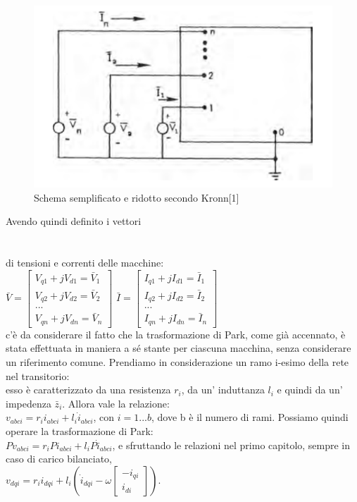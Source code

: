 \documentclass[Lau,noexaminfo]{sapthesis}
\begin{document}
	\begin{figure}
		\centering
		\includegraphics[height=0.25\textheight]{ridotta}
		\caption{Schema semplificato e ridotto secondo Kronn[1]}
	\end{figure}
	Avendo quindi definito i vettori\\\\\\ di tensioni e correnti delle macchine:\\
	$\bar{V}=\begin{bmatrix}
	V_{q1}+jV_{d1}=\bar{V}_1\\
	V_{q2}+jV_{d2}=\bar{V}_2\\
	...\\
	V_{qn}+jV_{dn}=\bar{V}_n
	\end{bmatrix}$\qquad
	$\bar{I}=\begin{bmatrix}
	I_{q1}+jI_{d1}=\bar{I}_1\\
	I_{q2}+jI_{d2}=\bar{I}_2\\
	...\\
	I_{qn}+jI_{dn}=\bar{I}_n
	\end{bmatrix}$\\
	c'è da considerare il fatto che la trasformazione di Park, come già accennato, è stata effettuata in maniera a sé stante per ciascuna macchina, senza considerare un riferimento comune.
	Prendiamo in considerazione un ramo i-esimo della rete nel transitorio:\\
	esso è caratterizzato da una resistenza $r_i$, da un' induttanza $l_i$ e quindi da un' impedenza $\bar{z}_i$. Allora vale la relazione:\\
	$v_{abci}=r_ii_{abci}+l_i\dot{i}_{abci}$, con $i=1...b$, dove b è il numero di rami.
	Possiamo quindi operare la trasformazione di Park:\\
	$Pv_{abci}=r_iPi_{abci}+l_iP\dot{i}_{abci}$, e sfruttando le relazioni nel primo capitolo, sempre in caso di carico bilanciato,\\ $v_{dqi}=r_ii_{dqi}+l_i(\dot{i}_{dqi}-\omega\begin{bmatrix}
	-i_{qi}\\
	i_{di}
	\end{bmatrix})$.\\
\end{document}
